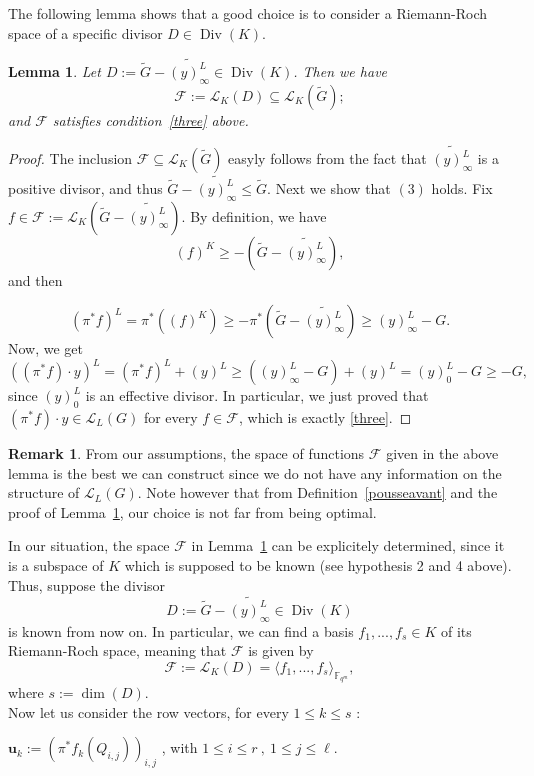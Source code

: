 \documentclass[10pt]{article}
\newtheorem{lem1}[thm]{Lemma}
\theoremstyle{definition}
\newtheorem{rq1}[thm]{Remark}
\theoremstyle{definition}
\theoremstyle{definition}
\newcommand{\cd}{\cdot}
\newcommand{\Fqm}{\mathbb{F}_{q^m}}
\newcommand{\su}{\subseteq}
\newcommand{\Div}{\operatorname{Div}}
\newcommand{\calL}{\mathcal{L}}
\begin{document}
The following lemma shows that a good choice is to consider a Riemann-Roch space of a specific divisor $D \in \Div(K)$.   

\begin{lem1} \label{constructionD} Let $D := \widetilde{G}-\widetilde{(y)^L_{\infty}} \in \Div(K)$. Then we have
\[\mathcal{F} := \calL_K(D) \su \calL_K(\tilde{G});\]
and $\mathcal{F}$ satisfies condition~\eqref{three} above.
\end{lem1}


\begin{proof}
The inclusion $\mathcal{F} \su \calL_K(\tilde{G})$ easyly follows from the fact that $\widetilde{(y)^L_{\infty}}$ is a positive divisor, and thus $\tilde{G}-\widetilde{(y)^L_{\infty}} \leq \tilde{G}$. Next we show that $(3)$ holds. Fix $f \in \mathcal{F} :=  \calL_K\left(\tilde{G}-\widetilde{(y)^L_{\infty}}\right)$. By definition, we have
\[(f)^K \geq -\left(\tilde{G}-\widetilde{(y)^L_{\infty}}\right),\]
and then

\[(\pi^*f)^L = \pi^*((f)^K) \geq -\pi^*\left(\tilde{G}-\widetilde{(y)^L_{\infty}}\right) \geq (y)^L_{\infty} - G.\]
Now, we get 
\[((\pi^*f) \cd y)^L = (\pi^*f)^L  + (y)^L \geq  ((y)^L_{\infty} - G)+(y)^L = (y)^L_0 - G \geq -G,\]
since $(y)^L_0$ is an effective divisor. In particular, we just proved that $(\pi^*f) \cd y \in \calL_L(G)$ for every $f \in \mathcal{F}$, which is exactly \eqref{three}.
\end{proof}

\begin{rq1}  \label{remark5}
From our assumptions, the space of functions $\mathcal{F}$ given in the above lemma is the best we can construct since we do not have any information on the structure of $\calL_L(G)$. Note however that from Definition~\ref{pousseavant} and the proof of Lemma~\ref{constructionD}, our choice is not far from being optimal.  
\end{rq1}

In our situation, the space $\mathcal{F}$ in Lemma~\ref{constructionD} can be explicitely determined, since it is a subspace of $K$ which is supposed to be known (see hypothesis 2 and 4 above). Thus, suppose the divisor 
\begin{equation} \label{four}
D := \tilde{G} - \widetilde{(y)^L_{\infty}} \in \Div(K)
\end{equation}
is known from now on. In particular, we can find a basis $f_1,...,f_s \in K$ of its Riemann-Roch space, meaning that $\mathcal{F}$ is given by
\[\mathcal{F} := \calL_K(D) = \langle f_1,...,f_s \rangle_{\Fqm},\]
where $s := \dim(D)$. \\
Now let us consider the row vectors, for every $1 \leq k \leq s$ :
\begin{center}
$\mathbf{u}_{k}:= \left(\pi^*f_k(Q_{i,j})\right)_{i,j}$ , with $1 \leq i \leq r \ , \ 1 \leq j \leq \ell$.
\end{center}
\end{document}
